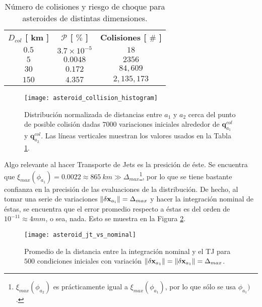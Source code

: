\begin{table}[h!]
\centering
\begin{tabular}{c|c|c}
\toprule
\textbf{$ D_{col}$ [ km ]} & \textbf{$\mathcal{P}$ [ $\%$ ]} & \textbf{Colisiones [ $ \# $ ]} \\ \cmidrule(l){1-3} 
\textbf{$0.5$} &   $3.7 \times 10^{-5}$   & $18$          \\
\textbf{$5$}   &   $0.0048$               & $2356$        \\
\textbf{$30$}  &   $0.172$                & $84,609$     \\
\textbf{$150$} &   $4.357$                & $2,135,173$   \\ \bottomrule 
\end{tabular}
\caption{Número de colisiones y riesgo de choque para asteroides de distintas dimensiones.}
\label{table:collision_table}
\end{table}

\begin{figure}
 \centering
 \texttt{[image: asteroid\_collision\_histogram]}
 \caption{Distribución normalizada de distancias entre $a_1$ y $a_2$ cerca del punto de posible colisión dadas $7000$ variaciones iniciales alrededor de $\mathbf{q}_{a_1}^{col}$ y $\mathbf{q}_{a_2}^{col}$. Las líneas verticales muestran los valores usados en la Tabla \ref{table:collision_table}.}
 \label{fig:asteroid_collision_histogram}
\end{figure}


Algo relevante al hacer Transporte de Jets es la presición de éste. Se encuentra que $\xi_{max}(\phi_{a_1}) = 0.0022 \approx 865 \ km \gg \Delta_{max}$\footnote{$\xi_{max}(\phi_{a_2})$ es prácticamente igual a $\xi_{max}(\phi_{a_1})$, por lo que sólo se usa $\phi_{a_1})$.}, por lo que se tiene bastante confianza en la precisión de las evaluaciones de la distribución. De hecho, al tomar una serie de variaciones $\left\lVert\delta\mathbf{x}_{a_i}\right\rVert = \Delta_{max}$ y hacer la integración nominal de éstas, se encuentra que el error promedio respecto a éstas es del orden de $10^{-11} \approx 4 mm$, o sea, nada. Esto se muestra en la Figura \ref{fig:asteroid_jt_vs_nominal}.

\begin{figure}
 \centering
 \texttt{[image: asteroid\_jt\_vs\_nominal]}
 \caption{Promedio de la distancia entre la integración nominal y el TJ para $500$ condiciones iniciales con variación $\left\lVert\delta\mathbf{x}_{a_1}\right\rVert = \left\lVert\delta\mathbf{x}_{a_1}\right\rVert = \Delta_{max}$.}
 \label{fig:asteroid_jt_vs_nominal}
\end{figure}

